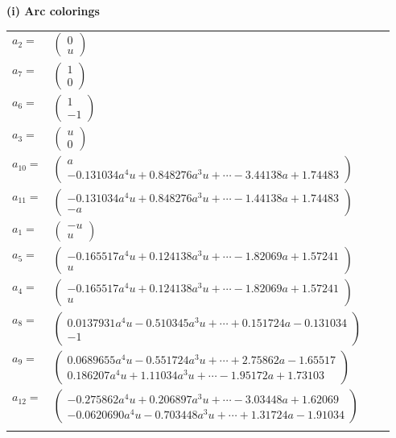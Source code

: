 \documentclass[1p]{elsarticle_modified}
\theoremstyle{definition}
\begin{document}
\flushleft \textbf{(i) Arc colorings}\\
\begin{tabular}{m{7pt} m{180pt} m{7pt} m{180pt} }
\flushright $a_{2}=$&$\begin{pmatrix}0\\u\end{pmatrix}$ \\
\flushright $a_{7}=$&$\begin{pmatrix}1\\0\end{pmatrix}$ \\
\flushright $a_{6}=$&$\begin{pmatrix}1\\-1\end{pmatrix}$ \\
\flushright $a_{3}=$&$\begin{pmatrix}u\\0\end{pmatrix}$ \\
\flushright $a_{10}=$&$\begin{pmatrix}a\\-0.131034 a^{4} u+0.848276 a^{3} u+\cdots-3.44138 a+1.74483\end{pmatrix}$ \\
\flushright $a_{11}=$&$\begin{pmatrix}-0.131034 a^{4} u+0.848276 a^{3} u+\cdots-1.44138 a+1.74483\\- a\end{pmatrix}$ \\
\flushright $a_{1}=$&$\begin{pmatrix}- u\\u\end{pmatrix}$ \\
\flushright $a_{5}=$&$\begin{pmatrix}-0.165517 a^{4} u+0.124138 a^{3} u+\cdots-1.82069 a+1.57241\\u\end{pmatrix}$ \\
\flushright $a_{4}=$&$\begin{pmatrix}-0.165517 a^{4} u+0.124138 a^{3} u+\cdots-1.82069 a+1.57241\\u\end{pmatrix}$ \\
\flushright $a_{8}=$&$\begin{pmatrix}0.0137931 a^{4} u-0.510345 a^{3} u+\cdots+0.151724 a-0.131034\\-1\end{pmatrix}$ \\
\flushright $a_{9}=$&$\begin{pmatrix}0.0689655 a^{4} u-0.551724 a^{3} u+\cdots+2.75862 a-1.65517\\0.186207 a^{4} u+1.11034 a^{3} u+\cdots-1.95172 a+1.73103\end{pmatrix}$ \\
\flushright $a_{12}=$&$\begin{pmatrix}-0.275862 a^{4} u+0.206897 a^{3} u+\cdots-3.03448 a+1.62069\\-0.0620690 a^{4} u-0.703448 a^{3} u+\cdots+1.31724 a-1.91034\end{pmatrix}$\\&\end{tabular}
\end{document}
